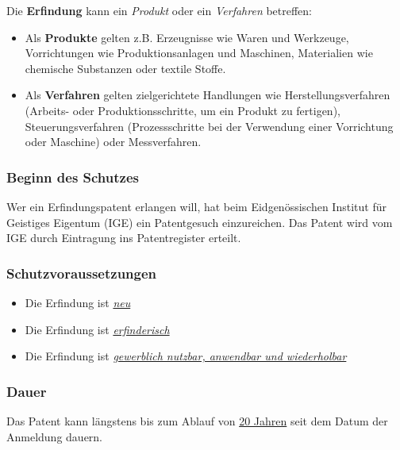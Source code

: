 Die \textbf{Erfindung} kann ein \textit{Produkt} oder ein \textit{Verfahren} betreffen:
\begin{itemize}
    \item Als \textbf{Produkte} gelten z.B. Erzeugnisse wie Waren und Werkzeuge, Vorrichtungen wie Produktionsanlagen und Maschinen, Materialien wie chemische Substanzen oder textile Stoffe.
    \item Als \textbf{Verfahren} gelten zielgerichtete Handlungen wie Herstellungsverfahren (Arbeits- oder Produktionsschritte, um ein Produkt zu fertigen), Steuerungsverfahren (Prozessschritte bei der Verwendung einer Vorrichtung oder Maschine) oder Messverfahren.
\end{itemize}

\subsubsection{Beginn des Schutzes}
Wer ein Erfindungspatent erlangen will, hat beim Eidgenössischen Institut für Geistiges Eigentum (IGE) ein Patentgesuch einzureichen.
Das Patent wird vom IGE durch Eintragung ins Patentregister erteilt.

\subsubsection{Schutzvoraussetzungen}
\begin{itemize}
    \item Die Erfindung ist \underline{\textit{neu}}
    \item Die Erfindung ist \underline{\textit{erfinderisch}}
    \item Die Erfindung ist \underline{\textit{gewerblich nutzbar, anwendbar und wiederholbar}}
\end{itemize}

\subsubsection{Dauer}
Das Patent kann längstens bis zum Ablauf von \underline{20 Jahren} seit dem Datum der Anmeldung dauern.

